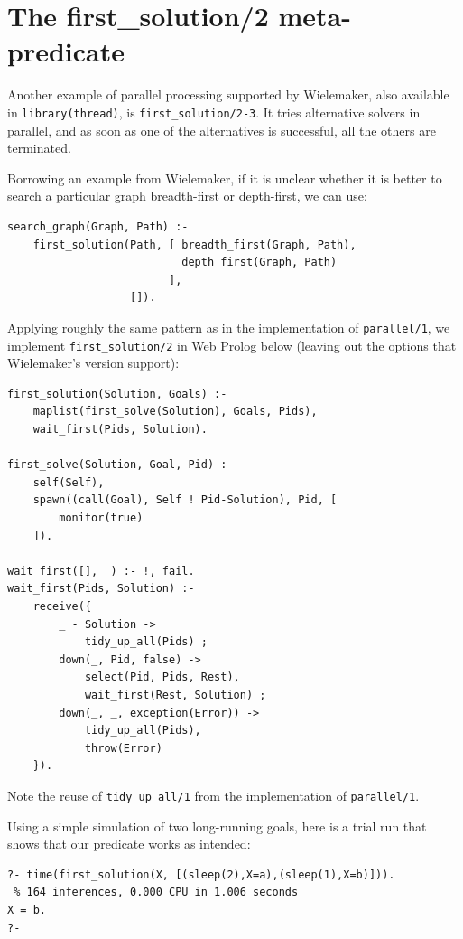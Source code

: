 \section{The first\_solution/2 meta-predicate}

Another example of parallel processing supported by Wielemaker, also available in \texttt{library(thread)}, is \texttt{first\_solution/2-3}. It tries alternative solvers in parallel, and as soon as one of the alternatives is successful, all the others are terminated.

Borrowing an example from Wielemaker, if it is unclear whether it is better to search a particular graph breadth-first or depth-first, we can use:

\begin{verbatim}
search_graph(Graph, Path) :-
    first_solution(Path, [ breadth_first(Graph, Path),
                           depth_first(Graph, Path)
                         ],
                   []).
\end{verbatim}

\noindent Applying roughly the same pattern as in the implementation of \texttt{parallel/1}, we implement \texttt{first\_solution/2} in Web Prolog below (leaving out the options that Wielemaker's version support):

\begin{verbatim}
first_solution(Solution, Goals) :-
    maplist(first_solve(Solution), Goals, Pids),
    wait_first(Pids, Solution).

first_solve(Solution, Goal, Pid) :-
    self(Self),
    spawn((call(Goal), Self ! Pid-Solution), Pid, [
        monitor(true)
    ]).

wait_first([], _) :- !, fail.
wait_first(Pids, Solution) :-
    receive({
        _ - Solution ->
            tidy_up_all(Pids) ;
        down(_, Pid, false) ->
            select(Pid, Pids, Rest),
            wait_first(Rest, Solution) ;
        down(_, _, exception(Error)) ->
            tidy_up_all(Pids),
            throw(Error)        
    }).
\end{verbatim}

\noindent Note the reuse of \texttt{tidy\_up\_all/1} from the implementation of \texttt{parallel/1}.

Using a simple simulation of two long-running goals, here is a trial run that shows that our predicate works as intended:

\begin{verbatim}
?- time(first_solution(X, [(sleep(2),X=a),(sleep(1),X=b)])).
 % 164 inferences, 0.000 CPU in 1.006 seconds
X = b.
?-
\end{verbatim} 


